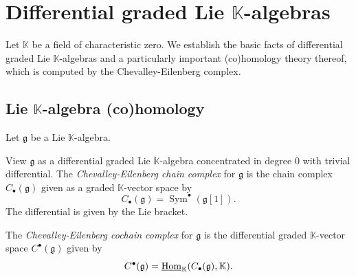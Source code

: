 \chapter{Differential graded Lie $\mathbb{K}$-algebras}\label{ch:3}

Let $\mathbb{K}$ be a field of characteristic zero. We establish the basic facts of differential graded Lie $\mathbb{K}$-algebras and a particularly important (co)homology theory thereof, which is computed by the Chevalley-Eilenberg complex.

\section{Lie $\mathbb{K}$-algebra (co)homology}\label{sec:3.1}

Let $\mathfrak{g} $ be a Lie $\mathbb{K} $-algebra.

\begin{definition}\label{3.1.1}
	View $\mathfrak{g} $ as a differential graded Lie $\mathbb{K} $-algebra concentrated in degree 0 with trivial differential. The \emph{Chevalley-Eilenberg chain complex} for $\mathfrak{g} $ is the chain complex $C_{\bullet} (\mathfrak{g} )$ given as a graded $\mathbb{K} $-vector space by
	\[
		C_{\bullet} (\mathfrak{g} ) = \operatorname{Sym} ^{\bullet}(\mathfrak{g} [1])
	.\]
	The differential is given by the Lie bracket.

	The \emph{Chevalley-Eilenberg cochain complex} for $\mathfrak{g} $ is the differential graded $\mathbb{K} $-vector space $C^{\bullet} (\mathfrak{g} )$ given by
	\[
		C^{\bullet} (\mathfrak{g} )=\underline{\operatorname{Hom}}_\mathbb{K} (C_{\bullet} (\mathfrak{g} ),\mathbb{K})
	.\]
\end{definition}

